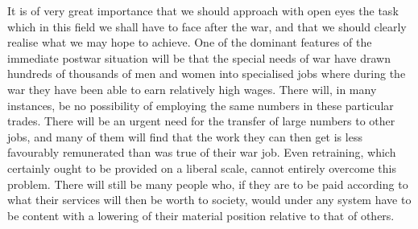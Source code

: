 \documentclass[11pt,openany]{book}
\begin{document}
It is of very great importance that we should approach with open eyes the task which in this field we shall have to face after the war, and that we should clearly realise what we may hope to achieve. One of the dominant features of the immediate postwar situation will be that the special needs of war have drawn hundreds of thousands of men and women into specialised jobs where during the war they have been able to earn relatively high wages. There will, in many instances, be no possibility of employing the same numbers in these particular trades. There will be an urgent need for the transfer of large numbers to other jobs, and many of them will find that the work they can then get is less favourably remunerated than was true of their war job. Even retraining, which certainly ought to be provided on a liberal scale, cannot entirely overcome this problem. There will still be many people who, if they are to be paid according to what their services will then be worth to society, would under any system have to be content with a lowering of their material position relative to that of others.
\end{document}
